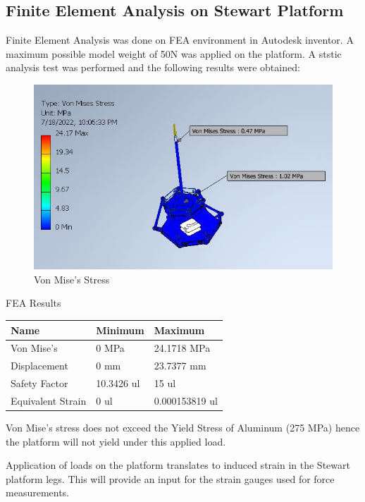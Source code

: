 \subsection{Finite Element Analysis on Stewart Platform}
Finite Element Analysis was done on FEA environment in Autodesk inventor. A maximum possible model weight of 50N was applied on the platform. 
A ststic analysis test was performed and the following results were obtained:
\begin{center}
	\begin{figure}[!htb]
	\centering
	\includegraphics[width=0.75\linewidth]{Figures/Von}
	\caption[Von Mise's Stress]{Von Mise's Stress}
	\end{figure}
\end{center}
\begin{table}[!h]
\caption{FEA Results}
\end{table}
\begin{center}
\begin{tabular}{|l|l|l|}
\hline
\textbf{Name} & \textbf{Minimum} & \textbf{Maximum}\\
\hline
Von Mise's & 0 MPa & 24.1718 MPa\\
\hline
Displacement & 0 mm & 23.7377 mm\\
\hline
Safety Factor & 10.3426 ul & 15 ul\\
\hline
Equivalent Strain & 0 ul & 0.000153819 ul\\
\hline
\end{tabular}
\end{center}
Von Mise's stress does not exceed the Yield Stress of Aluminum (275 MPa) hence the platform will not yield under this applied load.

Application of loads on the platform translates to induced strain in the Stewart platform legs. This will provide an input for the strain gauges used for force measurements.

